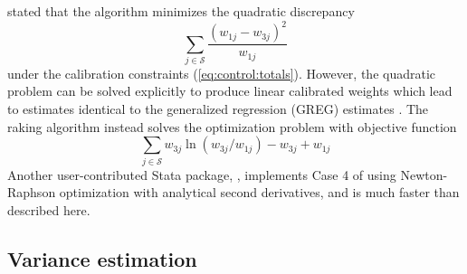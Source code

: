 \citet{deming:stephan:1940} stated that the algorithm minimizes the quadratic
discrepancy
$$
    \sum_{j \in \mathcal{S}} \frac{ (w_{1j}-w_{3j})^2}{w_{1j}}
$$
under the calibration constraints (\ref{eq:control:totals}).
However, the quadratic problem can be solved explicitly to
produce linear calibrated weights which lead to estimates
identical to the generalized regression (GREG) estimates
\citep[Case 1]{deville:sarndal:1992}. The raking algorithm instead solves
the optimization problem with objective function 
\citep[Case2]{deville:sarndal:1992}
\begin{equation}
    \sum_{j \in \mathcal{S}} w_{3j} \ln( w_{3j}/w_{1j}) - w_{3j} + w_{1j}
    \label{eq:raking:discrepancy}
\end{equation}
Another user-contributed Stata package, 
\citep{wittenberg:2010}, implements Case 4 of \citet{deville:sarndal:1992} using
Newton-Raphson optimization with analytical second derivatives,
and is much faster than  described here.

\subsection{Variance estimation}
\label{subsec:variance}

